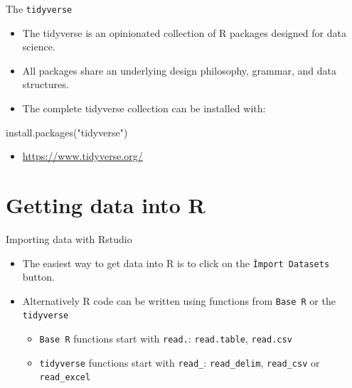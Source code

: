 \documentclass[
  ignorenonframetext,
]{beamer}
\newenvironment{Shaded}{\begin{snugshade}}{\end{snugshade}}
\newcommand{\FunctionTok}[1]{\textcolor[rgb]{0.00,0.00,0.00}{#1}}
\newcommand{\NormalTok}[1]{#1}
\newcommand{\StringTok}[1]{\textcolor[rgb]{0.31,0.60,0.02}{#1}}
\providecommand{\tightlist}{%
  \setlength{\itemsep}{0pt}\setlength{\parskip}{0pt}}
\begin{document}
\begin{frame}[fragile]{The \texttt{tidyverse}}
\protect\hypertarget{the-tidyverse}{}
\begin{itemize}
\tightlist
\item
  The tidyverse is an opinionated collection of R packages designed for
  data science.
\item
  All packages share an underlying design philosophy, grammar, and data
  structures.
\item
  The complete tidyverse collection can be installed with:
\end{itemize}

\begin{Shaded}
\begin{Highlighting}[]
\FunctionTok{install.packages}\NormalTok{(}\StringTok{"tidyverse"}\NormalTok{)}
\end{Highlighting}
\end{Shaded}

\begin{itemize}
\tightlist
\item
  \url{https://www.tidyverse.org/}
\end{itemize}
\end{frame}

\hypertarget{getting-data-into-r}{%
\section{Getting data into R}\label{getting-data-into-r}}

\begin{frame}[fragile]{Importing data with Rstudio}
\protect\hypertarget{importing-data-with-rstudio}{}
\begin{itemize}
\tightlist
\item
  The easiest way to get data into R is to click on the
  \texttt{Ìmport\ Datasets} button.
\item
  Alternatively R code can be written using functions from
  \texttt{Base\ R} or the \texttt{tidyverse}

  \begin{itemize}
  \tightlist
  \item
    \texttt{Base\ R} functions start with \texttt{read.}:
    \texttt{read.table}, \texttt{read.csv}
  \item
    \texttt{tidyverse} functions start with \texttt{read\_}:
    \texttt{read\_delim}, \texttt{read\_csv} or \texttt{read\_excel}
  \end{itemize}
\end{itemize}
\end{frame}
\end{document}
